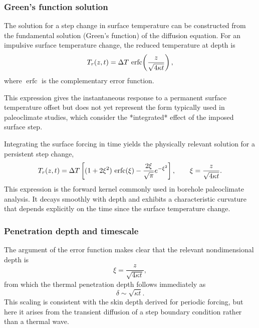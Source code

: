 \subsubsection*{Green's function solution}

The solution for a step change in surface temperature can be constructed from the
fundamental solution (Green's function) of the diffusion equation. For an impulsive
surface temperature change, the reduced temperature at depth is
\begin{equation}
    T_r(z,t) = \Delta T \, \operatorname{erfc} \!\left( \frac{z}{\sqrt{4\kappa t}} \right),
\end{equation}
where $\operatorname{erfc}$ is the complementary error function.

This expression gives the instantaneous response to a permanent surface temperature
offset but does not yet represent the form typically used in paleoclimate studies,
which consider the *integrated* effect of the imposed surface step.

Integrating the surface forcing in time yields the physically relevant solution for a persistent step change,
\begin{equation}
    T_r(z,t) =
    \Delta T
    \left[ (1 + 2\xi^2)\,\operatorname{erfc} (\xi) - \frac{2\xi}{\sqrt{\pi}} e^{-\xi^2} \right],
    \qquad
    \xi = \frac{z}{\sqrt{4\kappa t}}.
\end{equation}
This expression is the forward kernel commonly used in borehole paleoclimate analysis.  It decays smoothly with depth and exhibits a characteristic curvature that depends explicitly on the time since the surface temperature change.

\subsubsection*{Penetration depth and timescale}

The argument of the error function makes clear that the relevant nondimensional depth is
\begin{equation}
    \xi = \frac{z}{\sqrt{4\kappa t}},
\end{equation}
from which the thermal penetration depth follows immediately as
\begin{equation}
    \delta \sim \sqrt{\kappa t}.
\end{equation}
This scaling is consistent with the skin depth derived for periodic forcing, but here it arises from the transient diffusion of a step boundary condition rather than a thermal wave.


